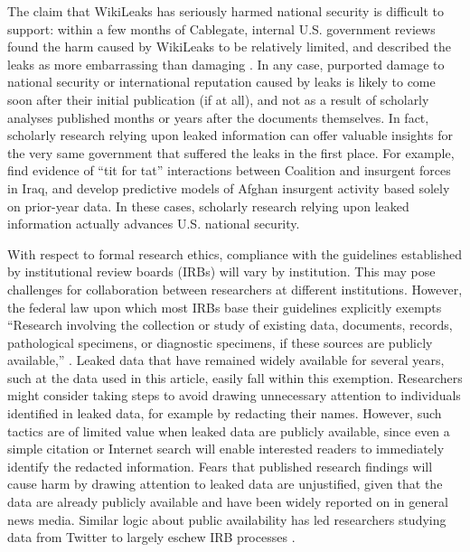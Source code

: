 \documentclass[12pt]{article}
\begin{document}
The claim that WikiLeaks has seriously harmed national security 
is difficult to support: within a few months of Cablegate, internal U.S. government 
reviews found the harm caused by WikiLeaks to be relatively limited, and described the leaks as more embarrassing than 
damaging \citep{hosenball2011u.s.}. In any case, purported damage to national security or international reputation caused by leaks is likely to come soon after their initial publication (if at all), 
and not as a result of scholarly analyses published months or years after the documents themselves. 
In fact, scholarly research relying upon leaked information can offer valuable insights for the very same 
government that suffered the leaks in the first place. For example, \citet{linke2012space-time} find evidence of 
``tit for tat'' interactions between Coalition and insurgent forces in Iraq, and \citet{zammit-mangion2012point} 
develop predictive models of Afghan insurgent activity based solely on prior-year data. In these cases, 
scholarly research relying upon leaked information actually advances U.S. national security.

With respect to formal research ethics, compliance with the guidelines established by institutional review boards (IRBs) will vary by institution. This may pose challenges for collaboration between researchers at different institutions.
However, the federal law upon which most IRBs base their guidelines explicitly exempts 
``Research involving the collection or study of existing data, documents, records, pathological specimens, or diagnostic
specimens, if these sources are publicly available,'' \citep[45 CFR 46.101 (b)(4)]{u.s._government2009code}.
Leaked data that have remained widely available for several years, such at the data used in this article, 
easily fall within this exemption.
Researchers might consider taking steps to avoid drawing unnecessary attention 
to individuals identified in leaked data, for example by redacting their names. However, such tactics 
are of limited value when leaked data are publicly available, since even a simple citation or Internet search will enable 
interested readers to immediately identify the redacted information.
Fears that published research findings will cause harm by drawing attention to leaked data are unjustified, 
given that the data are already publicly available and have been widely reported on in general news media. 
Similar logic about public availability has led researchers studying data from Twitter to largely eschew 
IRB processes \citep{zimmer2014topology}.
\end{document}

